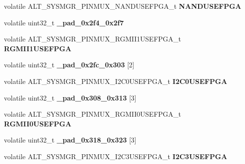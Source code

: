 \begin{DoxyCompactItemize}
volatile A\+L\+T\+\_\+\+S\+Y\+S\+M\+G\+R\+\_\+\+P\+I\+N\+M\+U\+X\+\_\+\+N\+A\+N\+D\+U\+S\+E\+F\+P\+G\+A\+\_\+t {\bfseries N\+A\+N\+D\+U\+S\+E\+F\+P\+GA}
\item 
\mbox{\label{structALT__SYSMGR__PINMUX__s_a76cd532f8e093c622bc16154a3322224}} 
volatile uint32\+\_\+t {\bfseries \+\_\+pad\+\_\+0x2f4\+\_\+0x2f7}
\item 
\mbox{\label{structALT__SYSMGR__PINMUX__s_ac84dad71de940bf70b69dd33507f998e}} 
volatile A\+L\+T\+\_\+\+S\+Y\+S\+M\+G\+R\+\_\+\+P\+I\+N\+M\+U\+X\+\_\+\+R\+G\+M\+I\+I1\+U\+S\+E\+F\+P\+G\+A\+\_\+t {\bfseries R\+G\+M\+I\+I1\+U\+S\+E\+F\+P\+GA}
\item 
\mbox{\label{structALT__SYSMGR__PINMUX__s_a7674f601cb800ca934b7b14c407ae7fd}} 
volatile uint32\+\_\+t {\bfseries \+\_\+pad\+\_\+0x2fc\+\_\+0x303} \mbox{[}2\mbox{]}
\item 
\mbox{\label{structALT__SYSMGR__PINMUX__s_aaccc720ceb52fb7869e7679cd6bd3f59}} 
volatile A\+L\+T\+\_\+\+S\+Y\+S\+M\+G\+R\+\_\+\+P\+I\+N\+M\+U\+X\+\_\+\+I2\+C0\+U\+S\+E\+F\+P\+G\+A\+\_\+t {\bfseries I2\+C0\+U\+S\+E\+F\+P\+GA}
\item 
\mbox{\label{structALT__SYSMGR__PINMUX__s_a6d26bc13266e45a432c73e31e3f35ae7}} 
volatile uint32\+\_\+t {\bfseries \+\_\+pad\+\_\+0x308\+\_\+0x313} \mbox{[}3\mbox{]}
\item 
\mbox{\label{structALT__SYSMGR__PINMUX__s_ae0af5340e957db7d20916b14b7d18548}} 
volatile A\+L\+T\+\_\+\+S\+Y\+S\+M\+G\+R\+\_\+\+P\+I\+N\+M\+U\+X\+\_\+\+R\+G\+M\+I\+I0\+U\+S\+E\+F\+P\+G\+A\+\_\+t {\bfseries R\+G\+M\+I\+I0\+U\+S\+E\+F\+P\+GA}
\item 
\mbox{\label{structALT__SYSMGR__PINMUX__s_a83c185c910ab3a3de14e0770b0b01ada}} 
volatile uint32\+\_\+t {\bfseries \+\_\+pad\+\_\+0x318\+\_\+0x323} \mbox{[}3\mbox{]}
\item 
\mbox{\label{structALT__SYSMGR__PINMUX__s_a7e52923c10f18dc46d55eeb508705411}} 
volatile A\+L\+T\+\_\+\+S\+Y\+S\+M\+G\+R\+\_\+\+P\+I\+N\+M\+U\+X\+\_\+\+I2\+C3\+U\+S\+E\+F\+P\+G\+A\+\_\+t {\bfseries I2\+C3\+U\+S\+E\+F\+P\+GA}

\end{DoxyCompactItemize}
